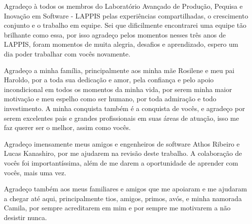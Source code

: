\begin{agradecimentos}
Agradeço à todos os membros do Laboratório Avançado de Produção, Pequisa e
Inovação em Software - LAPPIS pelas experiências compartilhadas, o crescimento conjunto
 e o trabalho em equipe. Sei que dificilmente encontrarei uma equipe tão brilhante
como essa, por isso agradeço pelos momentos nesses três anos de LAPPIS, foram momentos de muita alegria,
desafios e aprendizado, espero um dia poder trabalhar com vocês novamente.

Agradeço a minha família, principalmente aos minha mãe Rosilene e meu pai Haroldo,
por a toda sua dedicação e amor, pela confiança e pelo apoio incondicional em todos
os momentos da minha vida, por serem minha maior motivação e meu espelho como
ser humano, por toda admiração e todo investimento. A minha conquista também é
a conquista de vocês, e agradeço por serem excelentes pais e grandes profissionais em suas
áreas de atuação, isso me faz querer ser o melhor, assim como vocês.

Agradeço imensamente meus amigos e engenheiros de software Athos Ribeiro e Lucas
Kanashiro, por me ajudarem na revisão deste trabalho. A colaboração de vocês foi 
importantíssima, além de me darem a oportunidade de aprender com vocês, 
mais uma vez.

Agradeço também aos meus familiares e amigos que me apoiaram e me ajudaram a chegar
até aqui, principalmente tios, amigos, primos, avós, e minha namorada Camila, por
sempre acreditarem em mim e por sempre me motivarem a não desistir nunca.
\end{agradecimentos}
